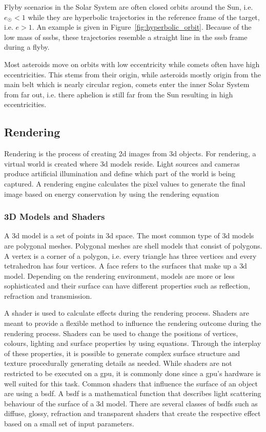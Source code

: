 Flyby scenarios in the Solar System are often closed orbits around the Sun, i.e. $e_{\astrosun} < 1$ while they are hyperbolic trajectories in the reference frame of the target, i.e. $e > 1$. An example is given in Figure~\ref{fig:hyperbolic_orbit}. Because of the low mass of \glspl{sssb}, these trajectories resemble a straight line in the \gls{sssb} frame during a flyby.

Most asteroids move on orbits with low eccentricity while comets often have high eccentricities. This stems from their origin, while asteroids mostly origin from the main belt which is nearly circular region, comets enter the inner Solar System from far out, i.e. there aphelion is still far from the Sun resulting in high eccentricities.

\subsection{Rendering}
Rendering is the process of creating \gls{2d} images from \gls{3d} objects. For rendering, a virtual world is created where \gls{3d} models reside. Light sources and cameras produce artificial illumination and define which part of the world is being captured. A rendering engine calculates the pixel values to generate the final image based on energy conservation by using the rendering equation~\cite{Kajiya1986TheEquation}

\subsubsection{3D Models and Shaders}
A \gls{3d} model is a set of points in \gls{3d} space. The most common type of \gls{3d} models are polygonal meshes. Polygonal meshes are shell models that consist of polygons. A vertex is a corner of a polygon, i.e. every triangle has three vertices and every tetrahedron has four vertices. A face refers to the surfaces that make up a \gls{3d} model. Depending on the rendering environment, models are more or less sophisticated and their surface can have different properties such as reflection, refraction and transmission.

A shader is used to calculate effects during the rendering process. Shaders are meant to provide a flexible method to influence the rendering outcome during the rendering process. Shaders can be used to change the positions of vertices, colours, lighting and surface properties by using equations. Through the interplay of these properties, it is possible to generate complex surface structure and texture procedurally generating details as needed. While shaders are not restricted to be executed on a \gls{gpu}, it is commonly done since a \gls{gpu}'s hardware is well suited for this task.
Common shaders that influence the surface of an object are using a \gls{bsdf}. A \gls{bsdf} is a mathematical function that describes light scattering behaviour of the surface of a \gls{3d} model. There are several classes of \glspl{bsdf} such as diffuse, glossy, refraction and transparent shaders that create the respective effect based on a small set of input parameters.

